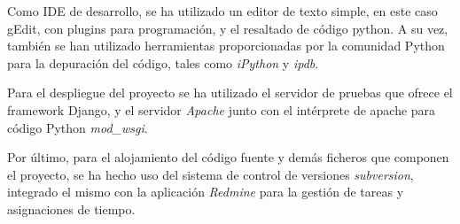 Como IDE de desarrollo, se ha utilizado un editor de texto simple, en este caso
gEdit, con plugins para programación, y el resaltado de código python. A su vez,
también se han utilizado herramientas proporcionadas por la comunidad Python
para la depuración del código, tales como \textit{iPython} y \textit{ipdb}.

Para el despliegue del proyecto se ha utilizado el servidor de pruebas que
ofrece el framework Django, y el servidor \textit{Apache} junto con el
intérprete de apache para código Python \textit{mod\_wsgi}.

Por último, para el alojamiento del código fuente y demás ficheros que componen
el proyecto, se ha hecho uso del sistema de control de versiones
\textit{subversion}, integrado el mismo con la aplicación \textit{Redmine} para
la gestión de tareas y asignaciones de tiempo.

